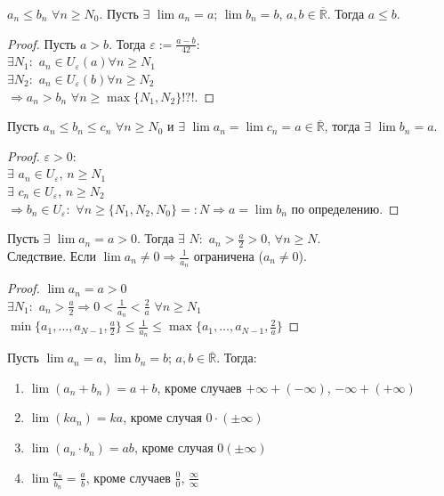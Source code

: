 \documentclass{article}
\begin{document}
	\begin{lemma}
		$a_n \leqslant b_n$ $\forall n \geqslant N_{0}$. Пусть $\exists$ $\lim a_n = a$; $\lim b_n = b$, $a, b \in \overline{\mathbb{R}}$. Тогда $a \leqslant b$.
	\end{lemma}
	\begin{proof}
		Пусть $a > b$. Тогда $\varepsilon := \frac{a - b}{42}:$ \\
		$\exists N_1:$ $a_n \in U_{\varepsilon} (a) \forall n \geqslant N_1$ \\
		$\exists N_2:$ $a_n \in U_{\varepsilon} (b) \forall n \geqslant N_2$ \\
		$\Rightarrow a_n > b_n$ $\forall n \geqslant \max\{N_1, N_2\} !?!$.
	\end{proof}
	\begin{lemma}
		Пусть $a_n \leqslant b_n \leqslant c_n$ $\forall n \geqslant N_0$ и $\exists$ $\lim a_n = \lim c_n = a \in \overline{\mathbb{R}}$, тогда $\exists$ $\lim b_n = a$.
	\end{lemma}
	\begin{proof}
		$\varepsilon > 0:$ \\
		$\exists$ $a_n \in U_{\varepsilon}$, $n \geqslant N_1$ \\
		$\exists$ $c_n \in U_{\varepsilon}$, $n \geqslant N_2$ \\
		$\Rightarrow b_n \in U_{\varepsilon}:$ $\forall n \geqslant \{N_1, N_2, N_0\} =: N \Rightarrow a = \lim b_n$ по определению.
	\end{proof}
	\begin{lemma}
		Пусть $\exists$ $\lim a_n = a > 0$. Тогда $\exists$ $N:$ $a_n > \frac{a}{2} > 0$, $\forall n \geqslant N$. \\
		Следствие. Если $\lim a_n \not= 0 \Rightarrow \frac{1}{a_n}$ ограничена ($a_n \not= 0$).
	\end{lemma}
	\begin{proof}
		$\lim a_n = a > 0$ \\
		$\exists N_1:$ $a_n > \frac{a}{2} \Rightarrow 0 < \frac{1}{a_n} < \frac{2}{a}$ $\forall n \geqslant N_1$ \\
		$\min\{a_1, \dots, a_{N - 1}, \frac{a}{2}\} \leqslant \frac{1}{a_n} \leqslant \max\{a_1, \dots, a_{N - 1}, \frac{2}{a}\}$
	\end{proof}
	\begin{theorem}
		Пусть $\lim a_n = a$, $\lim b_n = b$; $a, b \in \overline{\mathbb{R}}$. Тогда:
		\begin{enumerate}
			\item $\lim (a_n + b_n) = a + b$, кроме случаев $+ \infty + (- \infty)$, $- \infty + (+ \infty)$
			\item $\lim (ka_n) = ka$, кроме случая $0 \cdot (\pm \infty)$
			\item $\lim (a_n \cdot b_n) = ab$, кроме случая $0 (\pm \infty)$
			\item $\lim \frac{a_n}{b_n} = \frac{a}{b}$, кроме случаев $\frac{0}{0}$, $\frac{\infty}{\infty}$
		\end{enumerate}
	\end{theorem}
\end{document}

